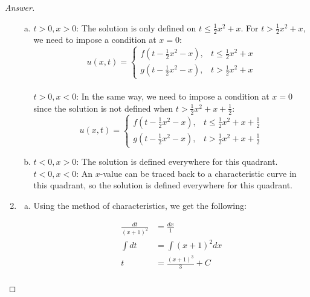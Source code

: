 \documentclass{article}
\theoremstyle{definition}
\renewcommand\qedsymbol{$\blacksquare$}
\newenvironment{ans}{\begin{proof}[Answer]\renewcommand{\qedsymbol}{}}{\end{proof}}
\begin{document}
\begin{ans}
\begin{enumerate}[(1), series=answers]
\begin{enumerate}[a)]
                    \item \underline{$t > 0, x > 0$}: The solution is only defined on $t \leq \frac{1}{2}x^2 + x$. For $t > \frac{1}{2}x^2 + x$, we need to impose a condition at $x = 0$:
                    \begin{equation*}
                    u(x,t) =
                    \begin{cases}
                        f\left(t-\frac{1}{2}x^2 - x\right), & t \leq \frac{1}{2}x^2 + x\\
                        g\left(t-\frac{1}{2}x^2 - x\right), & t > \frac{1}{2}x^2 + x
                    \end{cases}
                    \end{equation*}\\
                    \underline{$t > 0, x < 0$}: In the same way, we need to impose a condition at $x = 0$ since the solution is not defined when $t > \frac{1}{2}x^2 + x+\frac{1}{2}$:
                    \begin{equation*}
                    u(x,t) =
                    \begin{cases}
                        f\left(t-\frac{1}{2}x^2 - x\right), & t \leq \frac{1}{2}x^2 + x + \frac{1}{2}\\
                        g\left(t-\frac{1}{2}x^2 - x\right), & t > \frac{1}{2}x^2 + x + \frac{1}{2}
                    \end{cases}
                    \end{equation*}

                    \item \underline{$t < 0, x > 0$}: The solution is defined everywhere for this quadrant.\\
                    \underline{$t < 0, x < 0$}: An $x$-value can be traced back to a characteristic curve in this quadrant, so the solution is defined everywhere for this quadrant.
                \end{enumerate}

                \item \begin{enumerate}[a)]
                    \item Using the method of characteristics, we get the following:

                    \begin{align*}\frac{dt}{(x+1)^2} &= \frac{dx}{1}\\
                        \int dt &= \int (x+1)^2 dx\\
                        t &= \frac{(x + 1)^3}{3} + C\\
                    \end{align*}


\end{enumerate}
\end{enumerate}
\end{ans}
\end{document}
